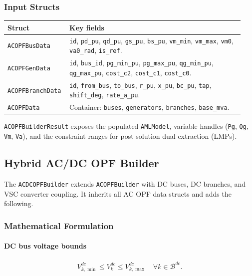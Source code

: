 \subsubsection{Input Structs}

\begin{longtable}{L{0.22\linewidth}L{0.72\linewidth}}
\toprule
Struct & Key fields \\
\midrule
\endhead
\texttt{ACOPFBusData} & \texttt{id}, \texttt{pd\_pu}, \texttt{qd\_pu}, \texttt{gs\_pu}, \texttt{bs\_pu}, \texttt{vm\_min}, \texttt{vm\_max}, \texttt{vm0}, \texttt{va0\_rad}, \texttt{is\_ref}. \\
\texttt{ACOPFGenData} & \texttt{id}, \texttt{bus\_id}, \texttt{pg\_min\_pu}, \texttt{pg\_max\_pu}, \texttt{qg\_min\_pu}, \texttt{qg\_max\_pu}, \texttt{cost\_c2}, \texttt{cost\_c1}, \texttt{cost\_c0}. \\
\texttt{ACOPFBranchData} & \texttt{id}, \texttt{from\_bus}, \texttt{to\_bus}, \texttt{r\_pu}, \texttt{x\_pu}, \texttt{bc\_pu}, \texttt{tap}, \texttt{shift\_deg}, \texttt{rate\_a\_pu}. \\
\texttt{ACOPFData} & Container: \texttt{buses}, \texttt{generators}, \texttt{branches}, \texttt{base\_mva}. \\
\bottomrule
\end{longtable}

\texttt{ACOPFBuilderResult} exposes the populated \texttt{AMLModel}, variable
handles (\texttt{Pg}, \texttt{Qg}, \texttt{Vm}, \texttt{Va}), and the
constraint ranges for post-solution dual extraction (LMPs).

\subsection{Hybrid AC/DC OPF Builder}
\label{sec:acdcopf-builder}

The \texttt{ACDCOPFBuilder} extends \texttt{ACOPFBuilder} with DC buses, DC
branches, and VSC converter coupling.  It inherits all AC OPF data structs and
adds the following.

\subsubsection{Mathematical Formulation}

\paragraph{DC bus voltage bounds}
\begin{align}
V_{k,\min}^{dc} \le V_k^{dc} \le V_{k,\max}^{dc}\quad \forall k\in\mathcal{B}^{dc}.
\end{align}


